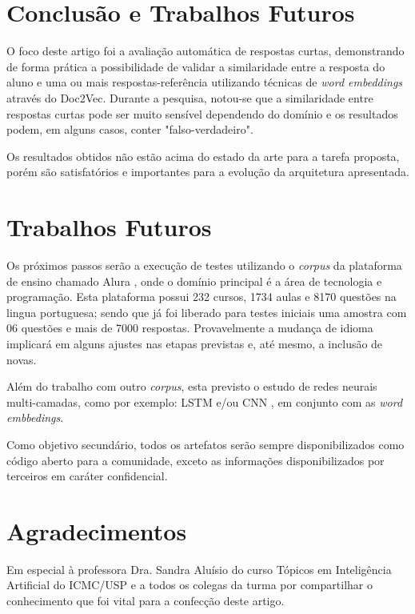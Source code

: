 \documentclass[conference]{IEEEtran}
\begin{document}
\section{Conclusão e Trabalhos Futuros}
O foco deste artigo foi a avaliação automática de respostas curtas, demonstrando de forma prática a possibilidade de validar a similaridade entre a resposta do aluno e uma ou mais respostas-referência utilizando técnicas de \textit{word embeddings} através do Doc2Vec. Durante a pesquisa, notou-se que a similaridade entre respostas curtas pode ser muito sensível dependendo do domínio e os resultados podem, em alguns casos, conter "falso-verdadeiro".

Os resultados obtidos não estão acima do estado da arte para a tarefa proposta, porém são satisfatórios e importantes para a evolução da arquitetura apresentada.

\section{Trabalhos Futuros}
Os próximos passos serão a execução de testes utilizando o \textit{corpus} da plataforma de ensino chamado Alura \cite{Alura:2016}, onde o domínio principal é a área de tecnologia e programação. Esta plataforma possui 232 cursos, 1734 aulas e 8170 questões na lingua portuguesa; sendo que já foi liberado para testes iniciais uma amostra com 06 questões e mais de 7000 respostas. Provavelmente a mudança de idioma implicará em alguns ajustes nas etapas previstas e, até mesmo, a inclusão de novas.

Além do trabalho com outro \textit{corpus}, esta previsto o estudo de redes neurais multi-camadas, como por exemplo: LSTM \cite{SkymindLSTM:2016} e/ou CNN \cite{SkymindCNN:2016}, em conjunto com as \textit{word embbedings}.

Como objetivo secundário, todos os artefatos serão sempre disponibilizados como código aberto para a comunidade, exceto as informações disponibilizados por terceiros em caráter confidencial.


\section*{Agradecimentos}
Em especial à professora Dra. Sandra Aluísio do curso Tópicos em Inteligência Artificial do ICMC/USP e a todos os colegas da turma por compartilhar o conhecimento que foi vital para a confecção deste artigo.
\end{document}
